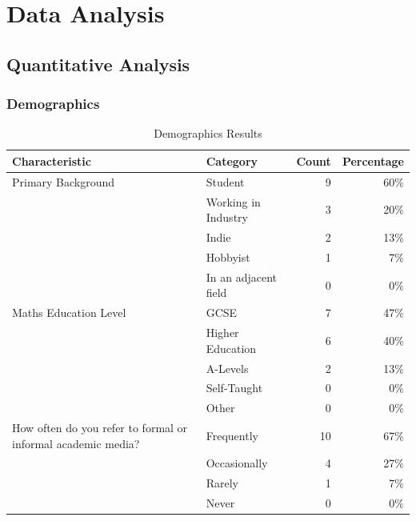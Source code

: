 \section{Data Analysis}

\subsection{Quantitative Analysis}

\subsubsection*{Demographics}

\begin{table}[H]
    \centering
    \small
    \renewcommand{\arraystretch}{1.75}
    \caption{Demographics Results}
    \label{tab:demographics-results}
        \begin{tabularx}{\textwidth}{@{} l X r r@{}}
        \toprule
        \textbf{Characteristic} & \textbf{Category} & \textbf{Count} & \textbf{Percentage} \\ \midrule
        Primary Background  & Student & 9 & 60\% \\
                            & Working in Industry & 3 & 20\% \\
                            & Indie & 2 & 13\% \\
                            & Hobbyist & 1 & 7\% \\
                            & In an adjacent field & 0 & 0\% \\ \midrule
        Maths Education Level & GCSE & 7 & 47\% \\
                              & Higher Education & 6 & 40\% \\
                              & A-Levels & 2 & 13\% \\
                              & Self-Taught & 0 & 0\% \\
                              & Other & 0 & 0\% \\ \midrule
        How often do you refer to formal or informal academic media? & Frequently & 10 & 67\% \\
        & Occasionally & 4 & 27\% \\
        & Rarely & 1 & 7\% \\
        & Never & 0 & 0\% \\
        \bottomrule
    \end{tabularx}
\end{table}

